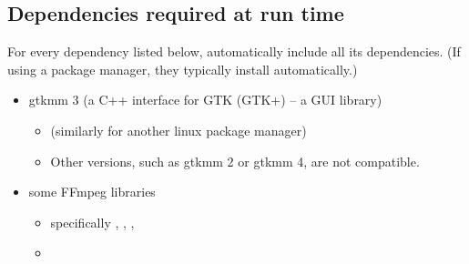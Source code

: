 \documentclass[11pt,a4paper,twoside,openright]{report}
\begin{document}
\subsection{Dependencies required at run time}\label{sec:runtimedeps}
For every dependency listed below, automatically include all its dependencies. (If using a package manager, they typically install automatically.)
\begin{itemize}
	\item gtkmm 3 (a C++ interface for GTK (GTK+) -- a GUI library)
		\begin{itemize}
			\item \pubinst{} (similarly for another linux package manager)
			\item Other versions, such as gtkmm 2 or gtkmm 4, are not compatible.
		\end{itemize}
	\item some FFmpeg libraries
		\begin{itemize}
			\item specifically , , , 
			\item \pubinst
		\end{itemize}
\end{itemize}
\end{document}
